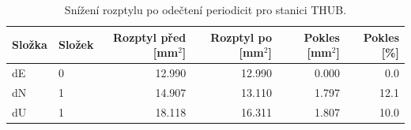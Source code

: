 \begin{table}[H]
\centering
\small
\caption{Snížení rozptylu po odečtení periodicit pro stanici THUB.}
\label{tab:gop25wd04_stcd_thub_detr_weighted_multiseg_spectral_lomb_scargle_variance_reduction}
\begin{tabular}{llrrrr}
\toprule
Složka & Složek & Rozptyl před [mm$^2$] & Rozptyl po [mm$^2$] & Pokles [mm$^2$] & Pokles [\%] \\
\midrule
dE & 0 & 12.990 & 12.990 & 0.000 & 0.0 \\
dN & 1 & 14.907 & 13.110 & 1.797 & 12.1 \\
dU & 1 & 18.118 & 16.311 & 1.807 & 10.0 \\
\bottomrule
\end{tabular}
\end{table}
